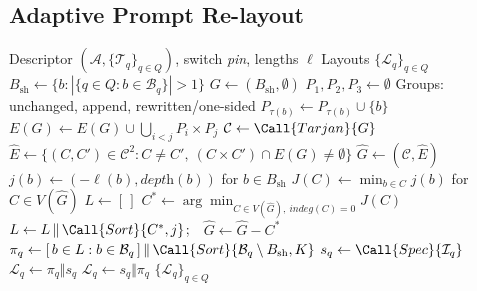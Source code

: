 \subsection{Adaptive Prompt Re-layout}
\label{sec:relayout}
\begin{algorithm}[t]
    \caption{Layout decision algorithm}
    \label{alg:layout}
    \begin{algorithmic}[1]
    \Require Descriptor $(\mathcal{A},\{\mathcal{T}_q\}_{q\in Q})$, switch \textit{pin}, lengths $\ell$
    \Ensure Layouts $\{\mathcal{L}_q\}_{q\in Q}$
    \State $B_{\mathrm{sh}} \gets \{b : |\{q\in Q : b\in\mathcal{B}_q\}|>1\}$\label{alg:layout:sh-begin}
    \State $G \gets(B_{\mathrm{sh}},\emptyset)$ 
        \State $P_1,P_2,P_3 \gets \emptyset$
        \Statex \hfill Groups: unchanged, append, rewritten/one-sided
            \State $P_{\tau(b)} \gets P_{\tau(b)}\cup\{b\}$ 
        \EndFor
        \State $E(G) \gets E(G)\cup\bigcup_{i<j}P_i\times P_j$
    \EndFor
    \State $\mathcal{C} \gets \Call{Tarjan}{G}$ 
    \State $\hat{E} \gets \{(C,C')\in\mathcal{C}^2 : C\neq C',\ (C\times C')\cap E(G)\neq\emptyset\}$
    \State $\hat{G} \gets (\mathcal{C},\hat{E})$ 
    \State $j(b) \gets (-\ell(b),\textit{depth}(b))$ for $b\in B_{\mathrm{sh}}$
    \State $J(C) \gets \min_{b\in C} j(b)$ for $C\in V(\hat{G})$
    \State $L \gets [\,]$
        \State $C^{*} \gets \arg\min_{C\in V(\hat{G}),\ \textit{indeg}(C)=0} J(C)$
        \State $L \gets L\,\Vert\,\Call{Sort}{C^{*},j}$;\ \ $\hat{G} \gets \hat{G}-C^{*}$ \label{alg:layout:sh-end}
    \EndWhile
        \State $\pi_q \gets [\,b\in L : b\in\mathcal{B}_q\,]\,\Vert\,\Call{Sort}{\mathcal{B}_q\setminus B_{\mathrm{sh}},K}$ \label{alg:layout:pv}
        \State $s_q \gets \Call{Spec}{\mathcal{I}_q}$  \label{alg:layout:spec-begin}
            \State $\mathcal{L}_q \gets \pi_q\Vert s_q$
        \Else
            \State $\mathcal{L}_q \gets s_q\Vert\pi_q$ \label{alg:layout:spec-end}
        \EndIf
    \EndFor
    \State \Return $\{\mathcal{L}_q\}_{q\in Q}$
    \end{algorithmic}
\end{algorithm}

